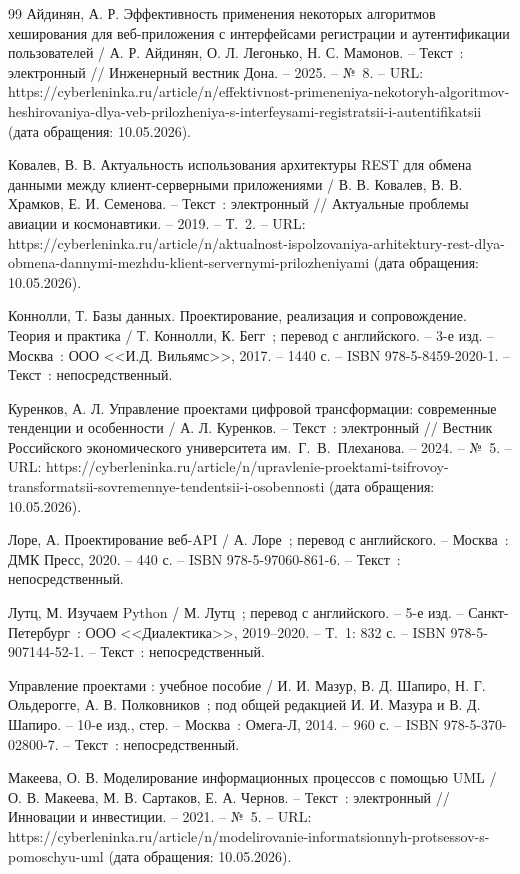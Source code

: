 \begin{thebibliography}{99}
	 Айдинян, А. Р. Эффективность применения некоторых алгоритмов хеширования для веб-приложения с интерфейсами регистрации и аутентификации пользователей / А. Р. Айдинян, О. Л. Легонько, Н. С. Мамонов. -- Текст~: электронный // Инженерный вестник Дона. -- 2025. -- №~8. -- URL: https://cyberleninka.ru/article/n/effektivnost-primeneniya-nekotoryh-algoritmov-heshirovaniya-dlya-veb-prilozheniya-s-interfeysami-registratsii-i-autentifikatsii (дата обращения: 10.05.2026).

	 Ковалев, В. В. Актуальность использования архитектуры REST для обмена данными между клиент-серверными приложениями / В. В. Ковалев, В. В. Храмков, Е. И. Семенова. -- Текст~: электронный // Актуальные проблемы авиации и космонавтики. -- 2019. -- Т.~2. -- URL: https://cyberleninka.ru/article/n/aktualnost-ispolzovaniya-arhitektury-rest-dlya-obmena-dannymi-mezhdu-klient-servernymi-prilozheniyami (дата обращения: 10.05.2026).

	 Коннолли, Т. Базы данных. Проектирование, реализация и сопровождение. Теория и практика / Т. Коннолли, К. Бегг~; перевод с английского. -- 3-е изд. -- Москва~: ООО <<И.Д. Вильямс>>, 2017. -- 1440 с. -- ISBN 978-5-8459-2020-1. -- Текст~: непосредственный.

	 Куренков, А. Л. Управление проектами цифровой трансформации: современные тенденции и особенности / А. Л. Куренков. -- Текст~: электронный // Вестник Российского экономического университета им.~Г.~В.~Плеханова. -- 2024. -- №~5. -- URL: https://cyberleninka.ru/article/n/upravlenie-proektami-tsifrovoy-transformatsii-sovremennye-tendentsii-i-osobennosti (дата обращения: 10.05.2026).

	 Лоре, А. Проектирование веб-API / А. Лоре~; перевод с английского. -- Москва~: ДМК Пресс, 2020. -- 440 с. -- ISBN 978-5-97060-861-6. -- Текст~: непосредственный.

	 Лутц, М. Изучаем Python / М. Лутц~; перевод с английского. -- 5-е изд. -- Санкт-Петербург~: ООО <<Диалектика>>, 2019--2020. -- Т.~1: 832 с. -- ISBN 978-5-907144-52-1. -- Текст~: непосредственный.

	 Управление проектами : учебное пособие / И. И. Мазур, В. Д. Шапиро, Н. Г. Ольдерогге, А. В. Полковников~; под общей редакцией И. И. Мазура и В. Д. Шапиро. -- 10-е изд., стер. -- Москва~: Омега-Л, 2014. -- 960 с. -- ISBN 978-5-370-02800-7. -- Текст~: непосредственный.

	 Макеева, О. В. Моделирование информационных процессов с помощью UML / О. В. Макеева, М. В. Сартаков, Е. А. Чернов. -- Текст~: электронный // Инновации и инвестиции. -- 2021. -- №~5. -- URL: https://cyberleninka.ru/article/n/modelirovanie-informatsionnyh-protsessov-s-pomoschyu-uml (дата обращения: 10.05.2026).


\end{thebibliography}
